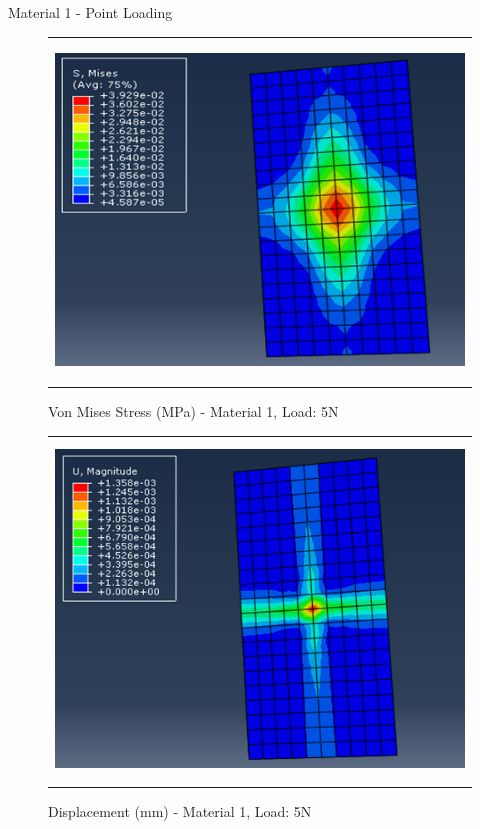 \documentclass[a4paper,12pt]{article}
\numberwithin{equation}{section}
\numberwithin{figure}{section}
\begin{document}
\newpage
\noindent Material 1 - Point Loading 
\begin{figure}[H]
  \centering
  \begin{tabular}{@{}c@{}}
    \includegraphics[width=0.7\linewidth,height=255pt]{Results/Point Loading/M1_VMS_L1.png} \\
  \end{tabular}
  \caption{Von Mises Stress (MPa) - Material 1, Load: 5N}
\end{figure}

\begin{figure}[H]
  \centering
  \begin{tabular}{@{}c@{}}
    \includegraphics[width=0.7\linewidth,height=255pt]{Results/Point Loading/M1_DIS_L1.png} \\
  \end{tabular}
  \caption{Displacement (mm) - Material 1, Load: 5N}
\end{figure}
\end{document}
